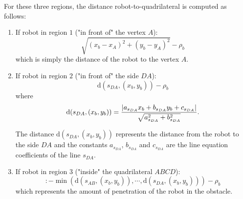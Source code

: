 \begin{enumerate}
    
    
 	
    For these three regions, the distance
    robot-to-quadrilateral is computed as follows:
    \begin{enumerate}
    
	   	\item \label{it:vora} If robot in region $1$ ("in front of" the vertex $A$):
   	   	\begin{equation*}
    	    \sqrt{(x_{b} - x_{A})^2 + (y_{b} - y_{A})^2} - \rho_b
	    \end{equation*}
	    which is simply the distance of the robot to the vertex $A$.
	    
	    \item \label{it:vorb} If robot in region $2$ ("in front of" the side $DA$):	    
		\begin{equation*}
			\mathrm{d}(s_{DA}, (x_{b}, y_{b})) - \rho_b
		\end{equation*}
		where
   	   	\begin{equation*}
    	    \mathrm{d}(s_{DA}, (x_{b}, y_{b})) =\\ \frac{|a_{s_{DA}}x_{b} + b_{s_{DA}}y_{b}
    	    + c_{s_{DA}}|}{\sqrt{a_{s_{DA}}^2 + b_{s_{DA}}^2}}.
	    \end{equation*}
	    
	    The distance $\mathrm{d}(s_{DA}, (x_{b}, y_{b}))$ represents the distance
	    from the robot to the side $DA$ and the constants $a_{s_{DA}}$, $b_{s_{DA}}$ and $c_{s_{DA}}$ are the line equation coefficients of the line $s_{DA}$.
	    
	    \item If robot in region $3$ ("inside" the quadrilateral $ABCD$):
   	   	\begin{equation*}:
    	    -\min\left(\mathrm{d}(s_{AB}, (x_{b}, y_{b})), \cdots, \mathrm{d}(s_{DA}, (x_{b}, y_{b}))\right) - \rho_b
	    \end{equation*}
	    which represents the amount of penetration of the robot in the obstacle.
	    

\end{enumerate}
\end{enumerate}

